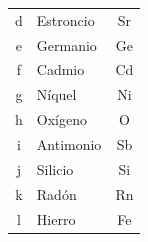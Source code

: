 \begin{exercise}
\begin{solu}
\begin{center}
\begin{tabular}{@{}clc@{}}
                d & Estroncio & Sr \\[3pt]
                e & Germanio & Ge \\[3pt]
                f & Cadmio & Cd \\[3pt]
                g & Níquel & Ni \\[3pt]
                h & Oxígeno & O \\[3pt]
                i & Antimonio & Sb \\[3pt]
                j & Silicio & Si \\[3pt]
                k & Radón & Rn \\[3pt]
                l & Hierro & Fe \\
                \bottomrule
            \end{tabular}
        \end{center}
    \end{solu}
\end{exercise}

